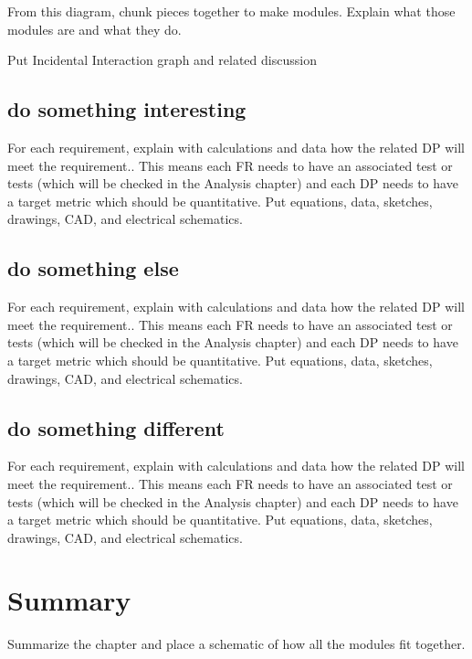 From this diagram, chunk pieces together to make modules.
Explain what those modules are and what they do.

Put Incidental Interaction graph and related discussion


\subsection{ do something interesting}
For each requirement, explain with calculations and data how the related DP will meet the requirement..
This means each FR needs to have an associated test or tests (which will be checked in the Analysis chapter) and each DP needs to have a target metric which should be quantitative.
Put equations, data, sketches, drawings, CAD, and electrical schematics.

\subsection{ do something else}
For each requirement, explain with calculations and data how the related DP will meet the requirement..
This means each FR needs to have an associated test or tests (which will be checked in the Analysis chapter) and each DP needs to have a target metric which should be quantitative.
Put equations, data, sketches, drawings, CAD, and electrical schematics.


\subsection{ do something different}
For each requirement, explain with calculations and data how the related DP will meet the requirement..
This means each FR needs to have an associated test or tests (which will be checked in the Analysis chapter) and each DP needs to have a target metric which should be quantitative.
Put equations, data, sketches, drawings, CAD, and electrical schematics.



\section{Summary}
Summarize the chapter and place a schematic of how all the modules fit together.


